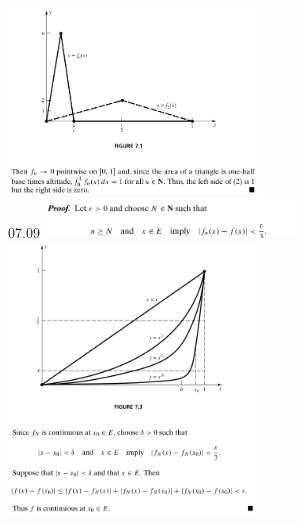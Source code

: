 \documentclass[8pt,landscape]{article}
\begin{document}
\begin{multicols}{3}
    \includegraphics[width=250]{07_06b.png} \\
    07.09
    \includegraphics[width=250]{07_09a.png} \\
    \includegraphics[width=250]{07_09b.png} \\

\end{multicols}
\end{document}

